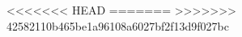 <<<<<<< HEAD
=======
>>>>>>> 42582110b465be1a96108a6027bf2f13d9f027bc
    \newcommand\scan{\(\text{r}^{2}\text{SCAN-3c}\)}

